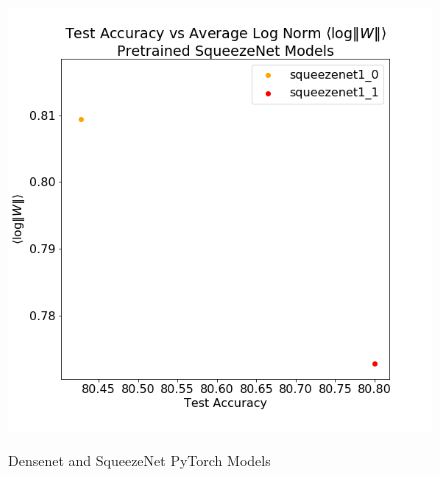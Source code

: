 \begin{figure}[!htb]
{        \includegraphics[scale=0.3]{img/squeezenet-lognorms.png} 
        \label{fig:squeezenet}
    }
        \caption{Densenet and SqueezeNet PyTorch Models}
    \label{fig:other2}
\end{figure}





